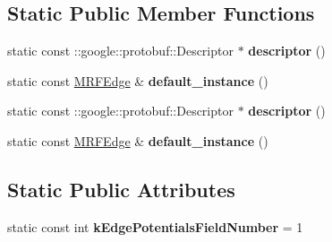 \subsection*{Static Public Member Functions}
\begin{DoxyCompactItemize}
\item 
\hypertarget{classgraph_1_1MRFEdge_a55d4c01824eab0261d72a1ea4c4028e2}{
static const ::google::protobuf::Descriptor $\ast$ {\bfseries descriptor} ()}
\label{classgraph_1_1MRFEdge_a55d4c01824eab0261d72a1ea4c4028e2}

\item 
\hypertarget{classgraph_1_1MRFEdge_a20f3bf54fe3438b549e3e39aa4768b8c}{
static const \hyperlink{classgraph_1_1MRFEdge}{MRFEdge} \& {\bfseries default\_\-instance} ()}
\label{classgraph_1_1MRFEdge_a20f3bf54fe3438b549e3e39aa4768b8c}

\item 
\hypertarget{classgraph_1_1MRFEdge_a9697b3be21e480abdeb24c964934d4cb}{
static const ::google::protobuf::Descriptor $\ast$ {\bfseries descriptor} ()}
\label{classgraph_1_1MRFEdge_a9697b3be21e480abdeb24c964934d4cb}

\item 
\hypertarget{classgraph_1_1MRFEdge_a7375f6abdee806d403d0f0c11a8c86d0}{
static const \hyperlink{classgraph_1_1MRFEdge}{MRFEdge} \& {\bfseries default\_\-instance} ()}
\label{classgraph_1_1MRFEdge_a7375f6abdee806d403d0f0c11a8c86d0}

\end{DoxyCompactItemize}
\subsection*{Static Public Attributes}
\begin{DoxyCompactItemize}
\item 
\hypertarget{classgraph_1_1MRFEdge_a8cbb86df3eb46154971fc4d59b9656f3}{
static const int {\bfseries kEdgePotentialsFieldNumber} = 1}
\label{classgraph_1_1MRFEdge_a8cbb86df3eb46154971fc4d59b9656f3}

\end{DoxyCompactItemize}
